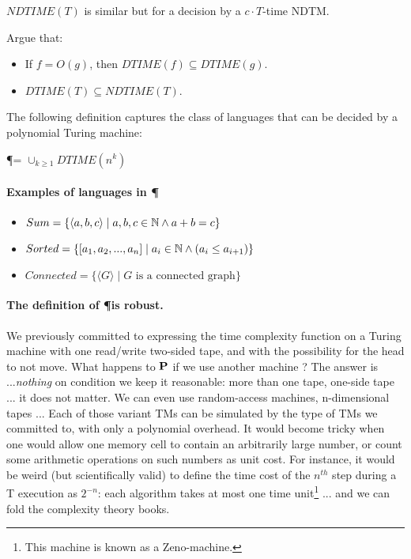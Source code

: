 $NDTIME(T)$ is similar but for a decision by a $c \cdot T$-time NDTM.

\begin{exercise}
Argue that:
\begin{itemize}
	\item If $f = O(g)$, then $DTIME(f) \subseteq DTIME(g)$.
	\item $DTIME(T) \subseteq NDTIME(T)$.
\end{itemize}
\end{exercise}

The following definition captures the class of languages that can be
decided by a polynomial Turing machine:

\begin{definition}
\P = $\cup_{k\geq 1} DTIME(n^k)$
\end{definition}

\paragraph{Examples of languages in \P}
\begin{itemize}
\item
$Sum = \{\langle a,b,c \rangle\mid a,b,c \in \N \wedge a+b=c\}$
\item
$Sorted = \{[a_1,a_2,...,a_n]\mid a_i \in \N \wedge (a_i \leq a_{i+1})\}$
\item
$Connected = \{\langle G \rangle\mid \text{$G$ is a connected graph}\}$
\end{itemize}

\paragraph{The definition of \P is robust.}
We previously committed to expressing the time complexity function on
a Turing machine with one read/write two-sided tape, and with the
possibility for the head to not move. What happens to $\P$ if we use
another machine ? The answer is ...{\em nothing} on condition we keep
it reasonable: more than one tape, one-side tape ... it does not
matter. We can even use random-access machines, n-dimensional tapes
... Each of those variant TMs can be simulated by the type of TMs we
committed to, with only a polynomial overhead. It would become tricky when
one would allow one memory cell to contain an arbitrarily large
number, or count some arithmetic operations on such numbers as unit
cost. For instance, it would be weird (but scientifically valid) to
define the time cost of the $n^{th}$ step during a T execution as
$2^{-n}$: each algorithm takes at most one time unit\footnote{This machine is known as a Zeno-machine.} ... and we can fold the
complexity theory books.


